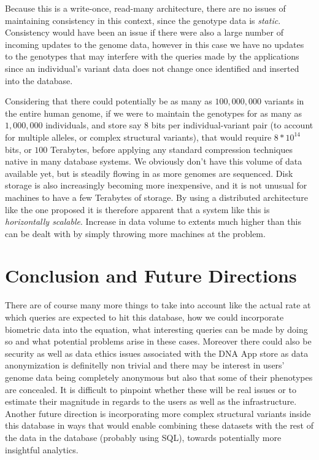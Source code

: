 \documentclass[conference,twocolumn,10pt]{IEEEtran}
\begin{document}
Because this is a write-once, read-many architecture, there are no issues of maintaining consistency in this context, since the genotype data is \textit{static}. Consistency would have been an issue if there were also a large number of incoming updates to the genome data, however in this case we have no updates to the genotypes that may interfere with the queries made by the applications since an individual’s variant data does not change once identified and inserted into the database.

Considering that there could potentially be as many as $100,000,000$ variants in the entire human genome, if we were to maintain the genotypes for as many as $1,000,000$ individuals, and store say $8$ bits per individual-variant pair (to account for multiple alleles, or complex structural variants), that would require $8*10^14$ bits, or $100$ Terabytes, before applying any standard compression techniques native in many database systems. We obviously don't have this volume of data available yet, but is steadily flowing in as more genomes are sequenced. Disk storage is also increasingly becoming more inexpensive, and it is not unusual for machines to have a few Terabytes of storage. By using a distributed architecture like the one proposed it is therefore apparent that a system like this is \textit{horizontally scalable}. Increase in data volume to extents much higher than this can be dealt with by simply throwing more machines at the problem.


\section{Conclusion and Future Directions}
There are of course many more things to take into account like the actual rate at which queries are expected to hit this database, how we could incorporate biometric data into the equation, what interesting queries can be made by doing so and what potential problems arise in these cases. Moreover there could also be security as well as data ethics issues associated with the DNA App store as data anonymization is definitelly non trivial and there may be interest in users’ genome data being completely anonymous but also that some of their phenotypes are concealed. It is difficult to pinpoint whether these will be real issues or to estimate their magnitude in regards to the users as well as the infrastructure. Another future direction is incorporating more complex structural variants inside this database in ways that would enable combining these datasets with the rest of the data in the database (probably using SQL), towards potentially more insightful analytics.
\end{document}
